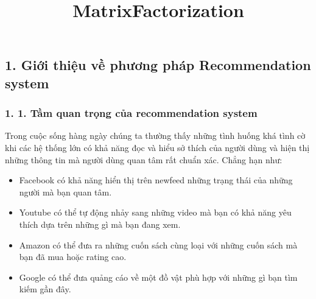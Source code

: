 \documentclass[11pt]{article}
\title{MatrixFactorization}
\providecommand{\tightlist}{%
      \setlength{\itemsep}{0pt}\setlength{\parskip}{0pt}}
\begin{document}
    
    
    \maketitle
    
    

    
    \subsection{1. Giới thiệu về phương pháp Recommendation
system}\label{giux1edbi-thiux1ec7u-vux1ec1-phux1b0ux1a1ng-phuxe1p-recommendation-system}

\subsubsection{1. 1. Tầm quan trọng của recommendation
system}\label{tux1ea7m-quan-trux1ecdng-cux1ee7a-recommendation-system}

Trong cuộc sống hàng ngày chúng ta thường thấy những tình huống khá tình
cờ khi các hệ thống lớn có khả năng đọc và hiểu sở thích của người dùng
và hiện thị những thông tin mà người dùng quan tâm rất chuẩn xác. Chẳng
hạn như:

\begin{itemize}
\tightlist
\item
  Facebook có khả năng hiển thị trên newfeed những trạng thái của những
  người mà bạn quan tâm.
\item
  Youtube có thể tự động nhảy sang những video mà bạn có khả năng yêu
  thích dựa trên những gì mà bạn đang xem.
\item
  Amazon có thể đưa ra những cuốn sách cùng loại với những cuốn sách mà
  bạn đã mua hoặc rating cao.
\item
  Google có thể đưa quảng cáo về một đồ vật phù hợp với những gì bạn tìm
  kiếm gần đây.
\end{itemize}
\end{document}
